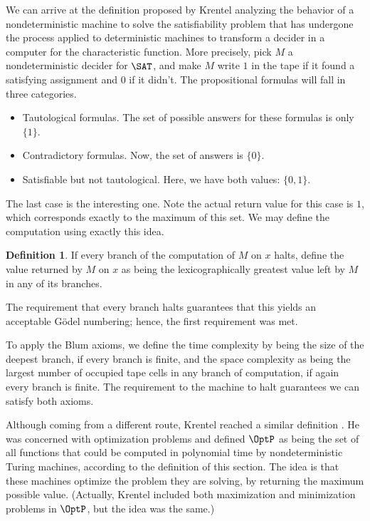 \documentclass[12pt]{article}
\theoremstyle{definition}
\newtheorem{definition}{Definition}
\begin{document}
We can arrive at the definition proposed by Krentel
analyzing the behavior of a nondeterministic machine to solve the satisfiability problem
that has undergone the process applied to deterministic machines
to transform a decider in a computer for the characteristic function.
More precisely,
pick $M$ a nondeterministic decider for $\SAT$,
and make $M$ write $1$ in the tape if it found a satisfying assignment
and $0$ if it didn't.
The propositional formulas will fall in three categories.
\begin{itemize}
    \item Tautological formulas.
        The set of possible answers for these formulas is only $\{1\}$.
    \item Contradictory formulas.
        Now, the set of answers is $\{0\}$.
    \item Satisfiable but not tautological.
        Here, we have both values: $\{0, 1\}$.
\end{itemize}
The last case is the interesting one.
Note the actual return value for this case is $1$,
which corresponds exactly to the maximum of this set.
We may define the computation using exactly this idea.

\begin{definition}
    If every branch of the computation of $M$ on $x$ halts,
    define the value returned by $M$ on $x$
    as being the lexicographically greatest value
    left by $M$ in any of its branches.
\end{definition}

The requirement that every branch halts
guarantees that this yields an acceptable Gödel numbering;
hence, the first requirement was met.

To apply the Blum axioms,
we define the time complexity by being the size of the deepest branch,
if every branch is finite,
and the space complexity as being the largest number of occupied tape cells
in any branch of computation,
if again every branch is finite.
The requirement to the machine to halt
guarantees we can satisfy both axioms.

Although coming from a different route,
Krentel reached a similar definition \cite{Krentel1988}.
He was concerned with optimization problems
and defined $\OptP$ as being the set of all functions
that could be computed in polynomial time
by nondeterministic Turing machines,
according to the definition of this section.
The idea is that these machines optimize the problem they are solving,
by returning the maximum possible value.
(Actually, Krentel included both maximization and minimization problems
in $\OptP$, but the idea was the same.)
\end{document}
